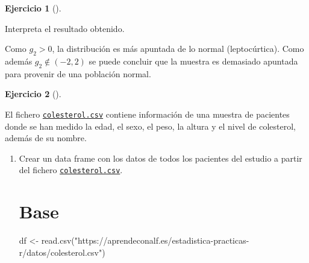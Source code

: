 \documentclass[
  a4paper,
]{scrreport}
\newenvironment{Shaded}{\begin{snugshade}}{\end{snugshade}}
\newcommand{\ExtensionTok}[1]{\textcolor[rgb]{0.00,0.23,0.31}{#1}}
\newcommand{\FunctionTok}[1]{\textcolor[rgb]{0.28,0.35,0.67}{#1}}
\newcommand{\NormalTok}[1]{\textcolor[rgb]{0.00,0.23,0.31}{#1}}
\newcommand{\OtherTok}[1]{\textcolor[rgb]{0.00,0.23,0.31}{#1}}
\newcommand{\StringTok}[1]{\textcolor[rgb]{0.13,0.47,0.30}{#1}}
\theoremstyle{definition}
\newtheorem{exercise}{Ejercicio}[chapter]
\theoremstyle{remark}
\begin{document}
\begin{exercise}[]
\begin{enumerate}
\begin{tcolorbox}
\begin{Shaded}
\begin{Highlighting}[]
\ExtensionTok{Interpreta}\NormalTok{ el resultado obtenido.}
\end{Highlighting}
\end{Shaded}

  Como \(g_2>0\), la distribución es más apuntada de lo normal
  (leptocúrtica). Como además \(g_2\not\in(-2,2)\) se puede concluir que
  la muestra es demasiado apuntada para provenir de una población
  normal.

  \end{tcolorbox}
\end{enumerate}

\end{exercise}

\begin{exercise}[]\protect\hypertarget{exr-descriptiva-colesterol}{}\label{exr-descriptiva-colesterol}

El fichero \href{datos/colesterol.csv}{\texttt{colesterol.csv}} contiene
información de una muestra de pacientes donde se han medido la edad, el
sexo, el peso, la altura y el nivel de colesterol, además de su nombre.

\begin{enumerate}
\def\labelenumi{\alph{enumi}.}
\item
  Crear un data frame con los datos de todos los pacientes del estudio a
  partir del fichero
  \href{datos/colesterol.csv}{\texttt{colesterol.csv}}.

  \begin{tcolorbox}[enhanced jigsaw, colframe=quarto-callout-tip-color-frame, toprule=.15mm, bottomtitle=1mm, breakable, opacitybacktitle=0.6, toptitle=1mm, colback=white, bottomrule=.15mm, title=\textcolor{quarto-callout-tip-color}{\faLightbulb}\hspace{0.5em}{Solución}, arc=.35mm, left=2mm, titlerule=0mm, rightrule=.15mm, coltitle=black, leftrule=.75mm, opacityback=0, colbacktitle=quarto-callout-tip-color!10!white]

  \section{Base}

\begin{Shaded}
\begin{Highlighting}[]
\NormalTok{df }\OtherTok{\textless{}{-}} \FunctionTok{read.csv}\NormalTok{(}\StringTok{"https://aprendeconalf.es/estadistica{-}practicas{-}r/datos/colesterol.csv"}\NormalTok{)}
\end{Highlighting}
\end{Shaded}


\end{tcolorbox}
\end{enumerate}
\end{exercise}
\end{document}
